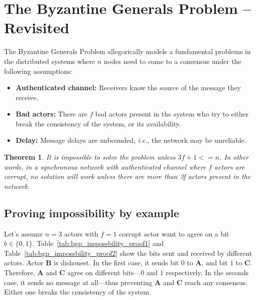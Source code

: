 \documentclass[twoside]{article}
\newcounter{lecnum}
\newtheorem{theorem}{Theorem}[lecnum]
\begin{document}
\section{The Byzantine Generals Problem -- Revisited}
The Byzantine Generals Problem allegorically models a fundamental problems in the distributed systems where $n$ nodes need to come to a consensus under the following assumptions:

\begin{itemize}
	\item \textbf{Authenticated channel:} Receivers know the source of the message they receive.
	\item \textbf{Bad actors:} There are $f$ bad actors present in the system who try to either break the consistency of the system, or its availability.
	\item \textbf{Delay:} Message delays are unbounded, \textit{i.e.}, the network may be unreliable.
\end{itemize}

\begin{theorem}
	It is impossible to solve the problem unless $3f + 1 <= n$.
	In other words, in a synchronous network with authenticated channel where $f$ actors are corrupt, no solution will work unless there are more than 3f actors present in the network. 
\end{theorem}

\subsection{Proving impossibility by example}
Let's assume $n=3$ actors with $f=1$ corrupt actor want to agree on a bit $b \in \{0,1\}$.
Table~\ref{tab:bgp_impossbility_proof1} and Table~\ref{tab:bgp_impossbility_proof2} show the bits sent and received by different actors.
Actor \textbf{B} is dishonest.
In the first case, it sends bit $0$ to \textbf{A}, and bit $1$ to \textbf{C}.
Therefore, \textbf{A} and \textbf{C} agree on different bits---$0$ and $1$ respectively.
In the seconds case, it sends no message at all---thus preventing \textbf{A} and \textbf{C} reach any consensus.
Either one breaks the consistency of the system.
\end{document}
